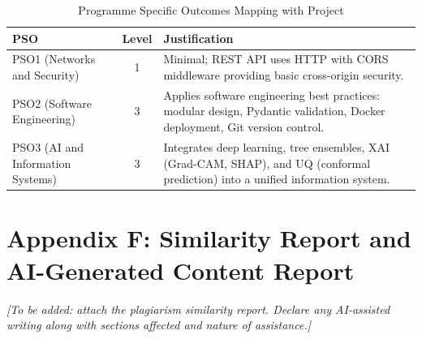 \documentclass[12pt,a4paper]{report}
\begin{document}
\begin{table}[h!]
\centering
\renewcommand{\arraystretch}{1.3}
\setlength{\tabcolsep}{6pt}
\caption{Programme Specific Outcomes Mapping with Project}
\label{tab:pso_mapping}
\begin{tabular}{|L{2.8cm}|c|L{8cm}|}
\hline
\textbf{PSO} & \textbf{Level} & \textbf{Justification} \\
\hline
PSO1 (Networks and Security) & 1 & Minimal; REST API uses HTTP with CORS middleware providing basic cross-origin security. \\
\hline
PSO2 (Software Engineering) & 3 & Applies software engineering best practices: modular design, Pydantic validation, Docker deployment, Git version control. \\
\hline
PSO3 (AI and Information Systems) & 3 & Integrates deep learning, tree ensembles, XAI (Grad-CAM, SHAP), and UQ (conformal prediction) into a unified information system. \\
\hline
\end{tabular}
\end{table}

\clearpage
\section{Appendix F: Similarity Report and AI-Generated Content Report}
\textit{[To be added: attach the plagiarism similarity report. Declare any AI-assisted writing along with sections affected and nature of assistance.]}
\end{document}
